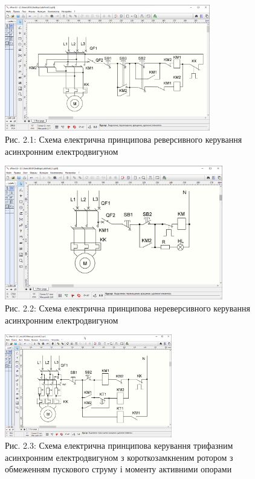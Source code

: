 \documentclass[a4paper]{article}
\begin{document}
\begin{figure}[h]
    \centering
    \includegraphics[width=0.8\textwidth]{imgs/LW2.1.png}
    \caption*{Рис. 2.1: Схема електрична принципова реверсивного керування асинхронним електродвигуном}
\end{figure} 

\begin{figure}[h]
    \centering
    \includegraphics[width=0.85\textwidth]{imgs/LW2.2.png}
    \caption*{Рис. 2.2: Схема електрична принципова нереверсивного керування асинхронним електродвигуном}
\end{figure} 
\newpage
\begin{figure}[h]
    \centering
    \includegraphics[width=0.65\textwidth]{imgs/LW2.3.png}
    \caption*{Рис. 2.3: Схема електрична принципова керування трифазним асинхронним електродвигуном з короткозамкненим ротором з обмеженням  пускового струму і моменту активними опорами}
\end{figure} 
\end{document}

